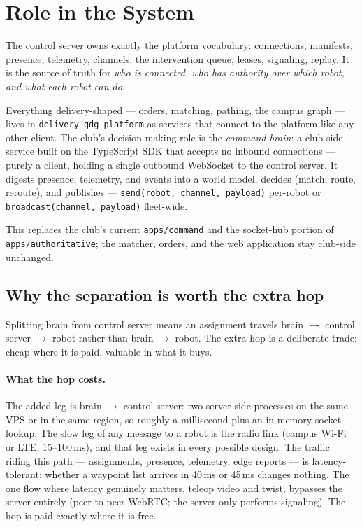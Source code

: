 \documentclass[11pt]{article}
\begin{document}
\section{Role in the System}

The control server owns exactly the platform vocabulary: connections, manifests,
presence, telemetry, channels, the intervention queue, leases, signaling, replay. It is
the source of truth for \emph{who is connected, who has authority over which robot, and
what each robot can do}.

Everything delivery-shaped --- orders, matching, pathing, the campus graph --- lives in
\texttt{delivery-gdg-platform} as services that connect to the platform like any other
client. The club's decision-making role is the \emph{command brain}: a club-side
service built on the TypeScript SDK that accepts no inbound connections --- purely a
client, holding a single outbound WebSocket to the control server. It digests
presence, telemetry, and events into a world model, decides (match, route, reroute),
and publishes --- \texttt{send(robot, channel, payload)} per-robot or
\texttt{broadcast(channel, payload)} fleet-wide.

This replaces the club's current \texttt{apps/command} and the socket-hub portion of
\texttt{apps/authoritative}; the matcher, orders, and the web application stay
club-side unchanged.

\subsection{Why the separation is worth the extra hop}

Splitting brain from control server means an assignment travels
brain $\to$ control server $\to$ robot rather than brain $\to$ robot. The extra hop is
a deliberate trade: cheap where it is paid, valuable in what it buys.

\paragraph{What the hop costs.} The added leg is brain $\to$ control server: two
server-side processes on the same VPS or in the same region, so roughly a millisecond
plus an in-memory socket lookup. The slow leg of any message to a robot is the radio
link (campus Wi-Fi or LTE, 15--100\,ms), and that leg exists in every possible design.
The traffic riding this path --- assignments, presence, telemetry, edge reports --- is
latency-tolerant: whether a waypoint list arrives in 40\,ms or 45\,ms changes nothing.
The one flow where latency genuinely matters, teleop video and twist, bypasses the
server entirely (peer-to-peer WebRTC; the server only performs signaling). The hop is
paid exactly where it is free.
\end{document}

